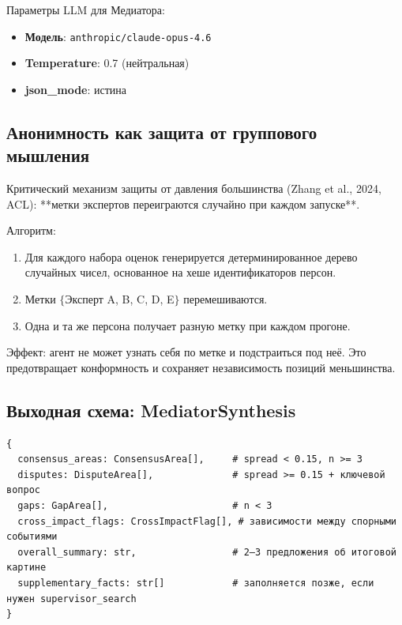 Параметры LLM для Медиатора:
\begin{itemize}
    \item \textbf{Модель}: \texttt{anthropic/claude-opus-4.6}
    \item \textbf{Temperature}: 0.7 (нейтральная)
    \item \textbf{json\_mode}: истина
\end{itemize}

\subsection{Анонимность как защита от группового мышления}


Критический механизм защиты от давления большинства (Zhang et al., 2024, ACL): **метки экспертов переиграются случайно при каждом запуске**.

Алгоритм:
\begin{enumerate}
    \item Для каждого набора оценок генерируется детерминированное дерево случайных чисел, основанное на хеше идентификаторов персон.
    \item Метки $\{$Эксперт A, B, C, D, E$\}$ перемешиваются.
    \item Одна и та же персона получает разную метку при каждом прогоне.
\end{enumerate}

Эффект: агент не может узнать себя по метке и подстраиться под неё. Это предотвращает конформность и сохраняет независимость позиций меньшинства.

\subsection{Выходная схема: MediatorSynthesis}

\begin{definition}
\begin{verbatim}
{
  consensus_areas: ConsensusArea[],     # spread < 0.15, n >= 3
  disputes: DisputeArea[],              # spread >= 0.15 + ключевой вопрос
  gaps: GapArea[],                      # n < 3
  cross_impact_flags: CrossImpactFlag[], # зависимости между спорными событиями
  overall_summary: str,                 # 2–3 предложения об итоговой картине
  supplementary_facts: str[]            # заполняется позже, если нужен supervisor_search
}
\end{verbatim}
\end{definition}

